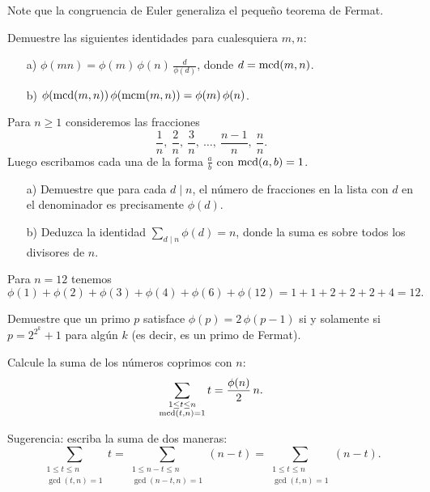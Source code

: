 \documentclass{article}
\begin{document}
Note que la congruencia de Euler generaliza el pequeño teorema de Fermat.

\begin{problema}
  Demuestre las siguientes identidades para cualesquiera $m,n$:

  \begin{enumerate}
  \item[a)] $\phi (mn) = \phi (m)\,\phi (n) \, \frac{d}{\phi (d)}$,
    donde $d = \operatorname{mcd} (m,n)$.

  \item[b)] $\phi(\operatorname{mcd} (m,n)) \, \phi(\operatorname{mcm} (m,n)) = \phi(m)\,\phi(n)$.
  \end{enumerate}
\end{problema}

\begin{problema}[Gauss]
  Para $n \ge 1$ consideremos las fracciones
  \[
    \frac{1}{n}, ~
    \frac{2}{n}, ~
    \frac{3}{n}, ~
    \ldots, ~
    \frac{n-1}{n}, ~
    \frac{n}{n}.
  \]
  Luego escribamos cada una de la forma $\frac{a}{b}$ con $\operatorname{mcd}(a,b) = 1$.

  \begin{enumerate}
  \item[a)] Demuestre que para cada $d \mid n$, el número de fracciones en la
    lista con $d$ en el denominador es precisamente $\phi (d)$.

  \item[b)] Deduzca la identidad $\sum_{d\mid n} \phi (d) = n$, donde la suma es
    sobre todos los divisores de $n$.
  \end{enumerate}
\end{problema}

\begin{ejemplo}
  Para $n = 12$ tenemos
  \[ \phi (1) + \phi (2) + \phi (3) + \phi (4) + \phi (6) + \phi (12) =
    1 + 1 + 2 + 2 + 2 + 4 = 12. \]
\end{ejemplo}

\begin{problema}
  Demuestre que un primo $p$ satisface $\phi (p) = 2\,\phi (p-1)$ si y solamente
  si $p = 2^{2^k} + 1$ para algún $k$ (es decir, es un primo de Fermat).
\end{problema}

\begin{problema}
  Calcule la suma de los números coprimos con $n$:
  $$\sum_{\substack{1 \le t \le n \\ \operatorname{mcd} (t,n) = 1}} t = \frac{\phi(n)}{2}\,n.$$

  Sugerencia: escriba la suma de dos maneras:
  \[
    \sum_{\substack{1 \le t \le n \\ \gcd (t,n) = 1}} t =
    \sum_{\substack{1 \le n-t \le n \\ \gcd (n-t,n) = 1}} (n-t) =
    \sum_{\substack{1 \le t \le n \\ \gcd (t,n) = 1}} (n-t).
  \]
\end{problema}
\end{document}
